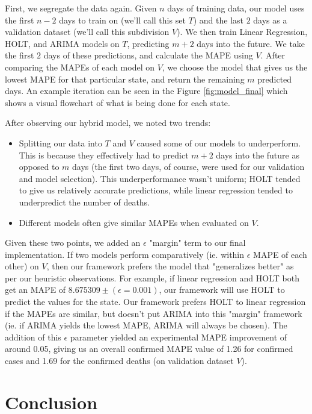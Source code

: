 \documentclass[sigconf,nonacm]{acmart}
\begin{document}
First, we segregate the data again. Given $n$ days of training data, our model
uses the first $n-2$ days to train on (we'll call this set $T$) and the last
$2$ days as a validation dataset (we'll call this subdivision $V$). We then
train Linear Regression, HOLT, and ARIMA models on $T$, predicting $m+2$ days
into the future. We take the first $2$ days of these predictions, and calculate
the MAPE using $V$. After comparing the MAPEs of each model on $V$, we choose
the model that gives us the lowest MAPE for that particular state, and return
the remaining $m$ predicted days. An example iteration can be seen in the 
Figure \ref{fig:model_final} which shows a visual flowchart of what is being done
for each state.

After observing our hybrid model, we noted two trends: 
\begin{itemize}
\item 
Splitting our data into $T$ and $V$ caused some of our models to
underperform. This is because they effectively had to predict $m+2$ days into
the future as opposed to $m$ days (the first two days, of course, were used for
our validation and model selection). This underperformance wasn't uniform;
HOLT tended to give us relatively accurate predictions, while linear regression
tended to underpredict the number of deaths. 
\item
Different models often give similar MAPEs when evaluated on $V$. 
\end{itemize}

Given these two points, we added an $\epsilon$ "margin" term to our final
implementation. If two models perform comparatively (ie. within $\epsilon$ MAPE
of each other) on $V$, then our framework prefers the model that "generalizes
better" as per our heuristic observations. For example, if linear regression
and HOLT both get an MAPE of $8.675309 \pm (\epsilon = 0.001)$, our framework
will use HOLT to predict the values for the state. Our framework prefers HOLT
to linear regression if the MAPEs are similar, but doesn't put ARIMA into this
"margin" framework (ie. if ARIMA yields the lowest MAPE, ARIMA will always be
chosen). The addition of this $\epsilon$ parameter yielded an experimental 
MAPE improvement of around 0.05, giving us an overall confirmed MAPE value of
1.26 for confirmed cases and 1.69 for the confirmed deaths (on validation
dataset $V$). 


\section{Conclusion}
\end{document}
